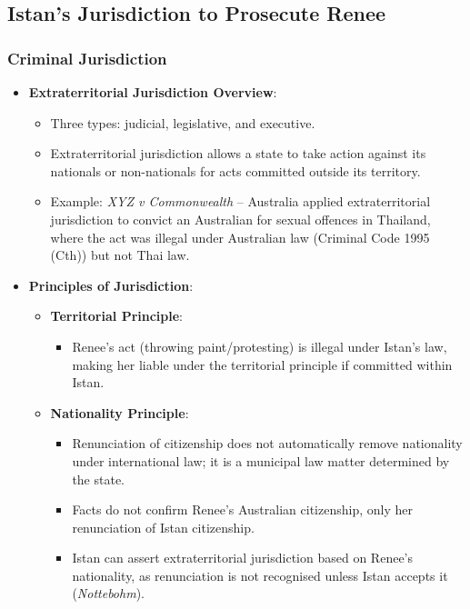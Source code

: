 \subsection{Istan’s Jurisdiction to Prosecute Renee}

\subsubsection{Criminal Jurisdiction}
\begin{itemize}
    \item \textbf{Extraterritorial Jurisdiction Overview}:
    \begin{itemize}
        \item Three types: judicial, legislative, and executive.
        \item Extraterritorial jurisdiction allows a state to take action against its nationals or non-nationals for acts committed outside its territory.
        \item Example: \textit{XYZ v Commonwealth} – Australia applied extraterritorial jurisdiction to convict an Australian for sexual offences in Thailand, where the act was illegal under Australian law (Criminal Code 1995 (Cth)) but not Thai law.
    \end{itemize}
    \item \textbf{Principles of Jurisdiction}:
    \begin{itemize}
        \item \textbf{Territorial Principle}:
        \begin{itemize}
            \item Renee’s act (throwing paint/protesting) is illegal under Istan’s law, making her liable under the territorial principle if committed within Istan.
        \end{itemize}
        \item \textbf{Nationality Principle}:
        \begin{itemize}
            \item Renunciation of citizenship does not automatically remove nationality under international law; it is a municipal law matter determined by the state.
            \item Facts do not confirm Renee’s Australian citizenship, only her renunciation of Istan citizenship.
            \item Istan can assert extraterritorial jurisdiction based on Renee’s nationality, as renunciation is not recognised unless Istan accepts it (\textit{Nottebohm}).

\end{itemize}
\end{itemize}
\end{itemize}
